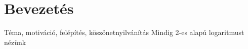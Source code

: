 \section*{Bevezetés}
\label{sec:bevezetes}
Téma, motiváció, felépítés, köszönetnyilvánítás
Mindig 2-es alapú logaritmust nézünk
\clearpage
